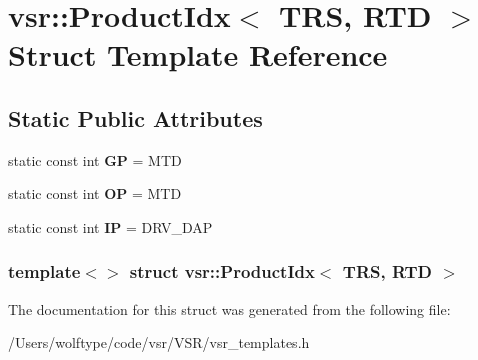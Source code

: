 \hypertarget{structvsr_1_1_product_idx_3_01_t_r_s_00_01_r_t_d_01_4}{\section{vsr\-:\-:Product\-Idx$<$ T\-R\-S, R\-T\-D $>$ Struct Template Reference}
\label{structvsr_1_1_product_idx_3_01_t_r_s_00_01_r_t_d_01_4}
}
\subsection*{Static Public Attributes}
\begin{DoxyCompactItemize}
\item 
\hypertarget{structvsr_1_1_product_idx_3_01_t_r_s_00_01_r_t_d_01_4_a00d4a97066c730fbd587345630eb7ccc}{static const int {\bfseries G\-P} = M\-T\-D}\label{structvsr_1_1_product_idx_3_01_t_r_s_00_01_r_t_d_01_4_a00d4a97066c730fbd587345630eb7ccc}

\item 
\hypertarget{structvsr_1_1_product_idx_3_01_t_r_s_00_01_r_t_d_01_4_a15264d94ba5c6ec0ea17bb3e675a281b}{static const int {\bfseries O\-P} = M\-T\-D}\label{structvsr_1_1_product_idx_3_01_t_r_s_00_01_r_t_d_01_4_a15264d94ba5c6ec0ea17bb3e675a281b}

\item 
\hypertarget{structvsr_1_1_product_idx_3_01_t_r_s_00_01_r_t_d_01_4_a6d6501ae48c8e56658180f9ba49df594}{static const int {\bfseries I\-P} = D\-R\-V\-\_\-\-D\-A\-P}\label{structvsr_1_1_product_idx_3_01_t_r_s_00_01_r_t_d_01_4_a6d6501ae48c8e56658180f9ba49df594}

\end{DoxyCompactItemize}
\subsubsection*{template$<$$>$ struct vsr\-::\-Product\-Idx$<$ T\-R\-S, R\-T\-D $>$}



The documentation for this struct was generated from the following file\-:\begin{DoxyCompactItemize}
\item 
/\-Users/wolftype/code/vsr/\-V\-S\-R/vsr\-\_\-templates.\-h\end{DoxyCompactItemize}

